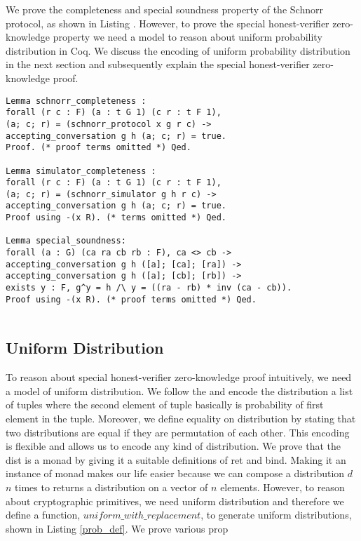 \documentclass[conference,compsoc]{IEEEtran}
\begin{document}
We prove the completeness and special soundness property of the Schnorr protocol, 
as shown in Listing \cite{comp_sound}. However, to prove the special honest-verifier 
zero-knowledge property we need a model to reason about uniform probability 
distribution in Coq. We discuss the encoding of uniform probability distribution 
in the next section and subsequently explain the special honest-verifier zero-knowledge
proof. 

\begin{lstlisting}[frame=single, language=Coq, caption={Completeness and Soundness},
  label={comp_sound},captionpos=t, basicstyle=\ttfamily\footnotesize,
  abovecaptionskip=-\medskipamount]
Lemma schnorr_completeness : 
forall (r c : F) (a : t G 1) (c r : t F 1),
(a; c; r) = (schnorr_protocol x g r c) ->
accepting_conversation g h (a; c; r) = true.
Proof. (* proof terms omitted *) Qed.
  
Lemma simulator_completeness : 
forall (r c : F) (a : t G 1) (c r : t F 1),
(a; c; r) = (schnorr_simulator g h r c) ->
accepting_conversation g h (a; c; r) = true.
Proof using -(x R). (* terms omitted *) Qed. 
  
Lemma special_soundness: 
forall (a : G) (ca ra cb rb : F), ca <> cb ->
accepting_conversation g h ([a]; [ca]; [ra]) ->  
accepting_conversation g h ([a]; [cb]; [rb]) ->
exists y : F, g^y = h /\ y = ((ra - rb) * inv (ca - cb)).
Proof using -(x R). (* proof terms omitted *) Qed.
  
\end{lstlisting}
 


 
\subsection{Uniform Distribution}
To reason about special honest-verifier zero-knowledge proof 
intuitively, we need a model of uniform distribution. 
We follow the \cite{erwig2006functional}  and 
encode the distribution a list of tuples where the 
second element of tuple basically is probability of first element 
in the tuple. Moreover, we define equality on distribution by 
stating that two distributions are equal if they are permutation 
of each other. This encoding is flexible and allows us 
to encode any kind of distribution. We prove that the dist is a 
monad \cite{erwig2006functional} by 
giving it a suitable definitions of ret and bind. Making 
it an instance of monad makes our life easier because 
we can compose a distribution $d$ $n$ times to 
returns a distribution on a vector of $n$ elements. 
However, to reason about cryptographic primitives, we need uniform 
distribution and therefore we define a function, $uniform\_with\_replacement$, 
to generate uniform distributions, shown in Listing \ref{prob_def}.
We prove various prop
\end{document}
